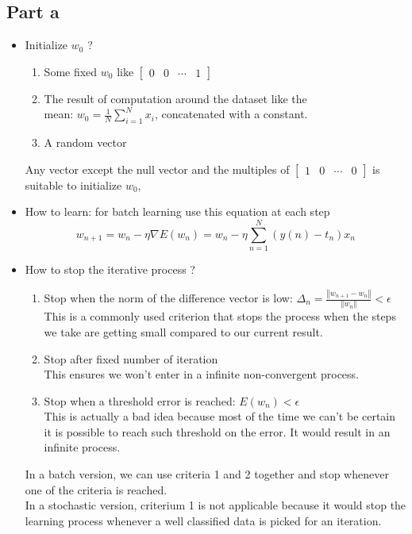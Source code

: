 \documentclass[a4paper, 10pt]{article}
\begin{document}
\subsection{Part a}
\begin{itemize}
    \item Initialize $w_0$ ?
    \begin{enumerate}
        \item Some fixed $w_0$ like $\begin{bmatrix}0 & 0 & \cdots & 1\end{bmatrix}$
        \item The result of computation around the dataset like the \\mean: $w_0 = \frac{1}{N}\sum_{i=1}^N x_i$, 
        concatenated with a constant.
        \item A random vector
    \end{enumerate}
    Any vector except the null vector and the multiples of $\begin{bmatrix}1 & 0 & \cdots &0\end{bmatrix}$ is suitable to initialize $w_0$, 
    \item How to learn: for batch learning use this equation at each step
    $$
    w_{n+1} = w_n - \eta \nabla E(w_n) = w_n - \eta \sum_{n=1}^{N}\left(y(n)-t_n\right)x_n
    $$
    \item How to stop the iterative process ?
    \begin{enumerate}
    \item Stop when the norm of the difference vector is low: $\Delta_n = \frac{\left\Vert w_{n+1} - w_n\right\Vert}{\left\Vert w_n \right\Vert} < \epsilon$
    \\
    This is a commonly used criterion that stops the process when the steps we take are getting small compared to our current result.
    \item Stop after fixed number of iteration
    \\
    This ensures we won't enter in a infinite non-convergent process. 
    \item Stop when a threshold error is reached: $E(w_n) < \epsilon $
    \\
    This is actually a bad idea because most of the time we can't be certain it is possible to reach such threshold on the error.
    It would result in an infinite process.
    \end{enumerate}
    In a batch version, we can use criteria 1 and 2 together and stop whenever one of 
    the criteria is reached.
    \\
    In a stochastic version, criterium 1 is not applicable because it would stop the learning process whenever a well classified data
    is picked for an iteration.
\end{itemize}
\end{document}
